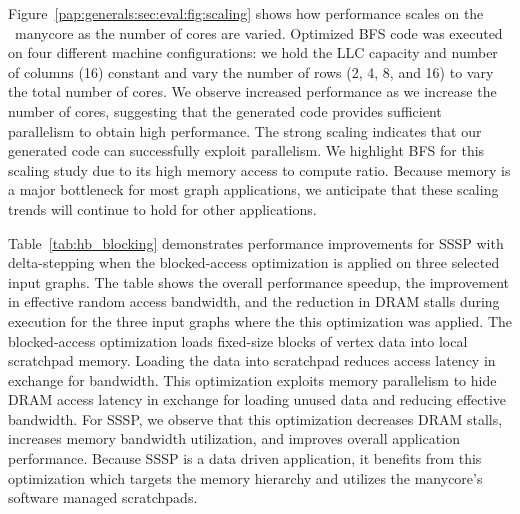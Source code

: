 \hbBlockingEvalTab

Figure~\ref{pap:generals:sec:eval:fig:scaling} shows how performance scales on the \hb~manycore as the number of cores are varied.
Optimized BFS code was executed on four different machine configurations: we hold the LLC capacity and number of columns (16) constant
and vary the number of rows (2, 4, 8, and 16) to vary the total number of cores.
We observe increased performance as we increase the number of cores, suggesting that the generated code provides sufficient parallelism to obtain high performance.
The strong scaling indicates that our generated code can successfully exploit parallelism.
We highlight BFS for this scaling study due to its high memory access to compute ratio.
Because memory is a major bottleneck for most graph applications, we anticipate that these scaling trends will continue to hold for other applications. 

Table~\ref{tab:hb_blocking} demonstrates performance improvements for SSSP with delta-stepping when the blocked-access optimization is applied on three selected input graphs.
The table shows the overall performance speedup, the improvement in effective random access bandwidth, and the reduction in DRAM stalls during execution for the three input graphs where the this optimization was applied.
The blocked-access optimization loads fixed-size blocks of vertex data into local scratchpad memory.
Loading the data into scratchpad reduces access latency in exchange for bandwidth.
This optimization exploits memory parallelism to hide DRAM access latency in exchange for loading unused data and reducing effective bandwidth.
For SSSP, we observe that this optimization decreases DRAM stalls, increases memory bandwidth utilization, and improves overall application performance.
Because SSSP is a data driven application, it benefits from this optimization which targets the memory hierarchy and utilizes the manycore's software managed scratchpads.

